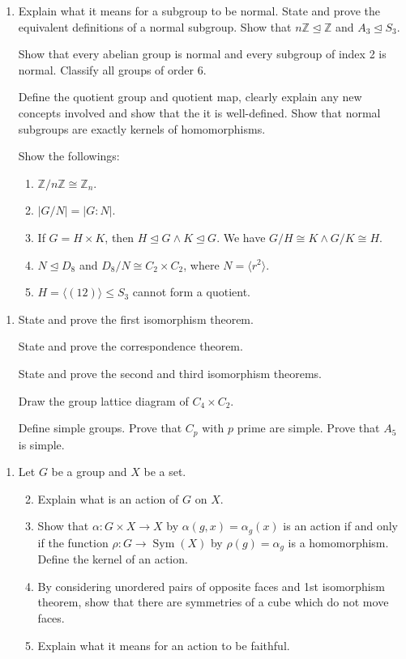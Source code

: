 \documentclass{article}
\newlength{\qspace}
\newcounter{qnumber}
\newenvironment{question}%
 {\vspace{\qspace}
  \begin{enumerate}[\bfseries 1\quad][10]%
    \setcounter{enumi}{\value{qnumber}}%
    \item%
 }
{
  \end{enumerate}
  \filbreak
  \stepcounter{qnumber}
 }
\newenvironment{questionparts}[1][1]%
 {
  \begin{enumerate}[\bfseries (i)]%
    \setcounter{enumii}{#1}
    \addtocounter{enumii}{-1}
    \setlength{\parskip}{3pt}
 }
 {
  \end{enumerate}
 }
\DeclareMathOperator{\sym}{Sym}
\def\le{\leqslant}
\begin{document}
\begin{question}
  Explain what it means for a subgroup to be normal. State and prove the equivalent definitions of a normal subgroup. Show that $ n \mathbb{Z} \trianglelefteq \mathbb{Z} $ and $ A_3 \trianglelefteq S_3 $.

  Show that every abelian group is normal and every subgroup of index 2 is normal. Classify all groups of order 6.

  Define the quotient group and quotient map, clearly explain any new concepts involved and show that the it is well-defined. Show that normal subgroups are exactly kernels of homomorphisms.

  Show the followings:
  \begin{enumerate}
    \item $ \mathbb{Z}/n\mathbb{Z} \cong \mathbb{Z}_{n} $.
    \item $ |G/N|=|G:N| $.
    \item If $ G=H\times K $, then $ H \trianglelefteq G \land K\trianglelefteq G $. We have $ G/H \cong K \land G/K \cong H $.
    \item $ N \trianglelefteq D_8 $ and $ D_8/N\cong C_2 \times C_2 $, where $ N=\langle r^2 \rangle  $. 
    \item $ H=\langle (12) \rangle \le S_3 $ cannot form a quotient.
  \end{enumerate}
\end{question}

\begin{question}
  State and prove the first isomorphism theorem.

  State and prove the correspondence theorem.

  State and prove the second and third isomorphism theorems.

  Draw the group lattice diagram of $ C_4 \times C_2 $.

  Define simple groups. Prove that $ C_p $ with $p$ prime are simple. Prove that $A_5$ is simple.
\end{question}

\begin{question}
  Let $ G $ be a group and $X$ be a set.
  \begin{questionparts}
    \item Explain what is an action of $G$ on $X$.
    \item Show that $ \alpha:G \times X \to X $ by $ \alpha(g,x)=\alpha_g(x) $ is an action if and only if the function $ \rho:G \to \sym(X) $ by $ \rho(g)=\alpha_g $ is a homomorphism. Define the kernel of an action.
    \item By considering unordered pairs of opposite faces and 1st isomorphism theorem, show that there are symmetries of a cube which do not move faces.
    \item Explain what it means for an action to be faithful.
  \end{questionparts}
\end{question}
\end{document}
